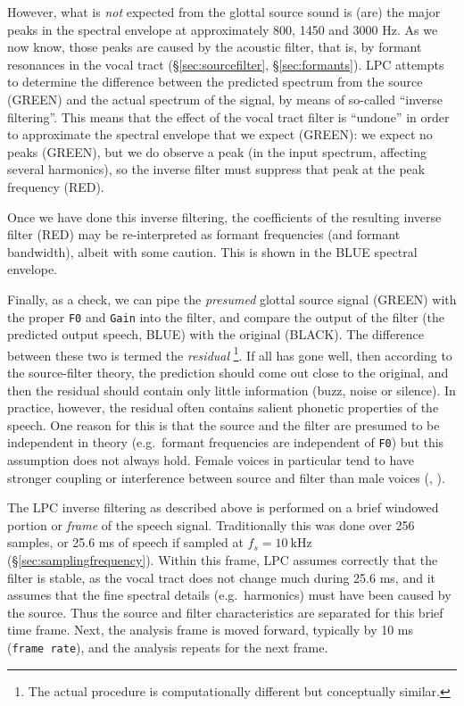 \documentclass[
]{book}
\begin{document}
However, what is \emph{not} expected from the glottal source sound is (are) the major peaks in the spectral envelope at approximately 800, 1450 and 3000 Hz. As we now know, those peaks are caused by the acoustic filter, that is, by formant resonances in the vocal tract (§\ref{sec:sourcefilter}, §\ref{sec:formants}).
LPC attempts to determine the difference between the predicted spectrum from the source (GREEN) and the actual spectrum of the signal, by means of so-called ``inverse filtering''. This means that the effect of the vocal tract filter is ``undone'' in order to approximate the spectral envelope that we expect (GREEN): we expect no peaks (GREEN), but we do observe a peak (in the input spectrum, affecting several harmonics), so the inverse filter must suppress that peak at the peak frequency (RED).

Once we have done this inverse filtering, the coefficients of the resulting inverse filter (RED) may be re-interpreted as formant frequencies (and formant bandwidth), albeit with some caution. This is shown in the BLUE spectral envelope.

Finally, as a check, we can pipe the \emph{presumed} glottal source signal (GREEN) with the proper \texttt{F0} and \texttt{Gain} into the filter, and compare the output of the filter (the predicted output speech, BLUE) with the original (BLACK). The difference between these two is termed the \emph{residual}
\footnote{The actual procedure is computationally different but conceptually similar.}.
If all has gone well, then according to the source-filter theory, the prediction should come out close to the original, and then the residual should contain only little information (buzz, noise or silence). In practice, however, the residual often contains salient phonetic properties of the speech. One reason for this is that the source and the filter are presumed to be independent in theory (e.g.~formant frequencies are independent of \texttt{F0}) but this assumption does not always hold. Female voices in particular tend to have stronger coupling or interference between source and filter than male voices (\citet{Titze_2008}, \citet{Klatt_Klatt_1990}).

The LPC inverse filtering as described above is performed on a brief windowed portion or \emph{frame} of the speech signal. Traditionally this was done over 256 samples, or 25.6 ms of speech if sampled at \(f_s = 10\  \textrm{kHz}\) (§\ref{sec:samplingfrequency}). Within this frame, LPC assumes correctly that the filter is stable, as the vocal tract does not change much during 25.6 ms, and it assumes that the fine spectral details (e.g.~harmonics) must have been caused by the source. Thus the source and filter characteristics are separated for this brief time frame. Next, the analysis frame is moved forward, typically by 10 ms (\texttt{frame\ rate}), and the analysis repeats for the next frame.
\end{document}
